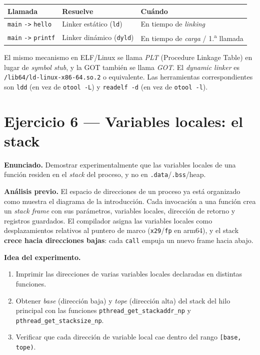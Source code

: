\documentclass[11pt,a4paper]{article}
\begin{document}
\begin{center}
\small
\begin{tabular}{l l l}
\toprule
\textbf{Llamada} & \textbf{Resuelve} & \textbf{Cuándo} \\
\midrule
\texttt{main} \texttt{->} \texttt{hello}  & Linker estático (\texttt{ld})    & En tiempo de \emph{linking} \\
\texttt{main} \texttt{->} \texttt{printf} & Linker dinámico (\texttt{dyld}) & En tiempo de \emph{carga} / 1.\textsuperscript{a} llamada \\
\bottomrule
\end{tabular}
\end{center}

\begin{idea}
El mismo mecanismo en ELF/Linux se llama \emph{PLT}
(Procedure Linkage Table) en lugar de \emph{symbol stub}, y la GOT
también se llama \emph{GOT}. El \emph{dynamic linker} es
\texttt{/lib64/ld-linux-x86-64.so.2} o equivalente. Las herramientas
correspondientes son \texttt{ldd} (en vez de \texttt{otool -L}) y
\texttt{readelf -d} (en vez de \texttt{otool -l}).
\end{idea}

\section{Ejercicio 6 --- Variables locales: el stack}

\textbf{Enunciado.} Demostrar experimentalmente que las variables
locales de una función residen en el \emph{stack} del proceso, y no
en \texttt{.data}/\texttt{.bss}/heap.

\textbf{Análisis previo.} El espacio de direcciones de un proceso ya
está organizado como muestra el diagrama de la introducción. Cada
invocación a una función crea un \emph{stack frame} con sus
parámetros, variables locales, dirección de retorno y registros
guardados. El compilador asigna las variables locales como
desplazamientos relativos al puntero de marco
(\texttt{x29}/\texttt{fp} en arm64), y el stack \textbf{crece hacia
direcciones bajas}: cada \texttt{call} empuja un nuevo frame hacia
abajo.

\textbf{Idea del experimento.}

\begin{enumerate}[leftmargin=*]
    \item Imprimir las direcciones de varias variables locales
        declaradas en distintas funciones.
    \item Obtener \emph{base} (dirección baja) y \emph{tope}
        (dirección alta) del stack del hilo principal con las
        funciones \texttt{pthread\_get\_stackaddr\_np} y
        \texttt{pthread\_get\_stacksize\_np}.
    \item Verificar que cada dirección de variable local cae dentro
        del rango \texttt{[base, tope)}.
\end{enumerate}
\end{document}
